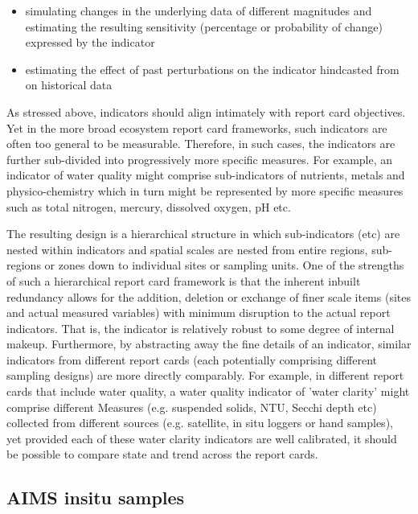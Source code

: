 \documentclass[a4paper]{AIMSreport}
\begin{document}
\begin{itemize}
\item simulating changes in the underlying data of different magnitudes and estimating the resulting
sensitivity (percentage or probability of change) expressed by the indicator
\item estimating the effect of past perturbations on the indicator hindcasted from on historical
data
\end{itemize}

As stressed above, indicators should align intimately with report card objectives.  Yet in the more
broad ecosystem report card frameworks, such indicators are often too general to be measurable.
Therefore, in such cases, the indicators are further sub-divided into progressively more specific
measures.  For example, an indicator of water quality might comprise sub-indicators of nutrients,
metals and physico-chemistry which in turn might be represented by more specific measures such as
total nitrogen, mercury, dissolved oxygen, pH etc.

The resulting design is a hierarchical structure in which sub-indicators (etc) are nested within
indicators and spatial scales are nested from entire regions, sub-regions or zones down to
individual sites or sampling units.  One of the strengths of such a hierarchical report card
framework is that the inherent inbuilt redundancy allows for the addition, deletion or exchange of
finer scale items (sites and actual measured variables) with minimum disruption to the actual report
indicators.  That is, the indicator is relatively robust to some degree of internal makeup.
Furthermore, by abstracting away the fine details of an indicator, similar indicators from different
report cards (each potentially comprising different sampling designs) are more directly comparably.
For example, in different report cards that include water quality, a water quality indicator of
'water clarity' might comprise different Measures (e.g. suspended solids, NTU, Secchi depth etc)
collected from different sources (e.g. satellite, in situ loggers or hand samples), yet provided
each of these water clarity indicators are well calibrated, it should be possible to compare state
and trend across the report cards.
  
   
 
  
\subsection{AIMS insitu samples}
\end{document}
